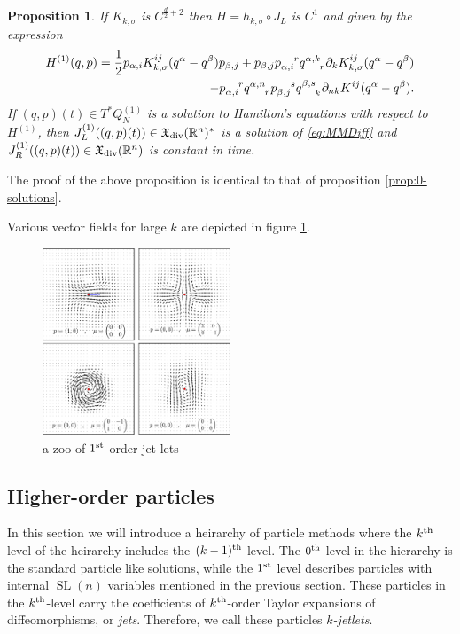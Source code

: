 \documentclass[12pt]{amsart}
\newcommand{\R}{\ensuremath{\mathbb{R}}}
\newtheorem{prop}[thm]{Proposition}
\DeclareMathOperator{\SL}{SL}
\begin{document}
  \begin{prop} \label{prop:1-solutions}
  	If $K_{k,\sigma}$ is $C^{\frac{d}{2} + 2}$ then $H = h_{k,\sigma} \circ J_L$
	is $C^1$ and given by the expression
	\begin{align*}
		H^{(1)}(q,p) = \frac{1}{2} p_{\alpha,i} K^{ij}_{k,\sigma}(q^\alpha - q^\beta) p_{\beta,j}
			+ p_{\beta,j} p \indices{_{\alpha,i}^r} q \indices{^{\alpha,k}_r} \partial_k K^{ij}_{k,\sigma}( q^\alpha - q^\beta) \\
			- p\indices{_{\alpha,i}^r} q\indices{^{\alpha,n}_r} p\indices{_{\beta,j}^s} q\indices{^{\beta,s}_k} \partial_{nk} K^{ij}(q^\alpha - q^\beta).
	\end{align*}
	If $(q,p)(t) \in T^*Q_N^{(1)}$ is a solution to Hamilton's equations with respect to 
	$H^{(1)}$, then $J_L^{(1)}( (q,p)(t)) \in \mathfrak{X}_{\rm div}(\R^n)^*$ is
	a solution of \eqref{eq:MMDiff} and $J_R^{(1)}( (q,p)(t)) \in \mathfrak{X}_{\rm div}(\R^n)$ is
	constant in time. 
  \end{prop}
  The proof of the above proposition is identical to that of proposition \ref{prop:0-solutions}.
  
  Various vector fields for large $k$
  are depicted in figure \ref{fig:zoo}.
  
  \begin{figure}
  	\centering
	\includegraphics[width=0.5\textwidth]{./images/zoo}
	\caption{a zoo of $1^{\rm st}$-order jet lets}
	\label{fig:zoo}
  \end{figure}

  \subsection{Higher-order particles}
  \label{sec:higher_order}
  In this section we will introduce a heirarchy of particle methods
  where the $k^{\rm th}$ level of the heirarchy includes the $(k-1)^{\rm th}$
  level.
  The $0^{\rm th}$-level in the hierarchy is the standard particle like solutions,
  while the $1^{\rm st}$ level describes particles with internal $\SL(n)$ variables
  mentioned in the previous section.
  These particles in the $k^{\rm th}$-level carry the coefficients of
  $k^{\rm th}$-order Taylor expansions of diffeomorphisms,
  or \emph{jets}.
  Therefore, we call these particles \emph{$k$-jetlets}.
\end{document}
